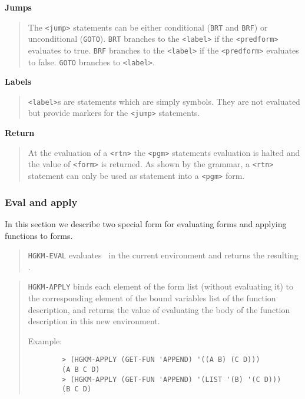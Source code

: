 {\bf Jumps}
\begin{quote}
	The {\tt <jump>} statements can be either conditional ({\tt BRT} and
	{\tt BRF}) or unconditional ({\tt GOTO}).
	{\tt BRT} branches to the {\tt <label>} if the {\tt <predform>} evaluates to
	true.
	{\tt BRF} branches to the {\tt <label>} if the {\tt <predform>} evaluates to
	false.
	{\tt GOTO} branches to {\tt <label>}.
\end{quote}

{\bf Labels}
\begin{quote}
	{\tt <label>}s are statements which are simply symbols.
	They are not evaluated but provide markers for the {\tt <jump>} statements.
\end{quote}

{\bf Return}
\begin{quote}
	At the evaluation of a {\tt <rtn>} the {\tt <pgm>} statements evaluation is
	halted and the value of {\tt <form>} is returned.
	As shown by the grammar, a {\tt <rtn>} statement can only be used as
	statement into a {\tt <pgm>} form.
\end{quote}


\subsubsection{Eval and apply}

In this section we describe two special form for evaluating forms and applying
functions to forms.

\bigskip

\begin{quote}
	{\tt HGKM-EVAL} evaluates \form\ in the current environment and returns the
	resulting \obj.
\end{quote}

\begin{quote}
	{\tt HGKM-APPLY} binds each element of the form list (without evaluating it)
	to the corresponding element of the bound variables list of the function
	description, and returns the value of evaluating the body of the function
	description in this new environment.

	Example:
	\begin{verbatim}
		> (HGKM-APPLY (GET-FUN 'APPEND) '((A B) (C D)))
		(A B C D)
		> (HGKM-APPLY (GET-FUN 'APPEND) '(LIST '(B) '(C D)))
		(B C D)
	\end{verbatim}
\end{quote}


